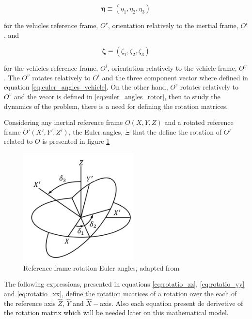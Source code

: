 \begin{equation}
    \boldsymbol{\eta} \equiv \left(\eta_1, \eta_2, \eta_3 \right)
    \label{eq:euler_angles_vehicle}
\end{equation}

for the vehicles reference frame, $O^r$, orientation relatively to the inertial frame, $O^i$, and

\begin{equation}
    \boldsymbol{\zeta} \equiv \left(\zeta_1, \zeta_2, \zeta_3 \right)
    \label{eq:euler_angles_rotor}
\end{equation}

for the vehicles reference frame, $O^i$, orientation relatively to the vehicle frame, $O^v$. The $O^v$ rotates relatively to $O^i$ and the three component vector where defined in equation \ref{eq:euler_angles_vehicle}. On the other hand, $O^r$ rotates relatively to $O^v$ and the vecor is defined in \ref{eq:euler_angles_rotor}, then to study the dynamics of the problem, there is a need for defining the rotation matrices.

Considering any inertial reference frame $O(X,Y,Z)$ and a rotated reference frame $O'(X',Y',Z')$, the Euler angles, $\Xi$ that the define the rotation of $O'$ related to $O$ is presented in figure \ref{fig:rotation_frames_img}

\begin{figure}[!htb]
    \centering
        \includegraphics[width=6cm]{Figures/implementation/model/rotation_frames.png}
        \caption{Reference frame rotation Euler angles, adapted from \cite{schwab_how_2006}}
        \label{fig:rotation_frames_img}
\end{figure}

The following expressions, presented in equations \ref{eq:rotatio_zz}, \ref{eq:rotatio_yy} and \ref{eq:rotatio_xx}, define the rotation matrices of a rotation over the each of the reference axis $\hat{Z}$, $\hat{Y}$ and $\hat{X}-$axis. Also each equation present de derivetive of the rotation matrix which will be needed later on this mathematical model.


